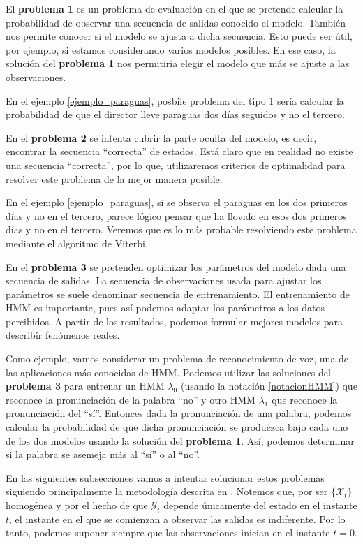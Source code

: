 El \textbf{problema 1} es un problema de evaluación en el que se pretende calcular la probabilidad de observar una secuencia de salidas conocido el modelo. También nos permite conocer si el modelo se ajusta a dicha secuencia. Esto puede ser útil, por ejemplo, si estamos considerando varios modelos posibles. En ese caso, la solución del \textbf{problema 1} nos permitiría elegir el modelo que más se ajuste a las observaciones.

En el ejemplo \ref{ejemplo_paraguas}, posbile problema del tipo 1 sería calcular la probabilidad de que el director lleve paraguas dos días seguidos y no el tercero.

En el \textbf{problema 2} se intenta cubrir la parte oculta del modelo, es decir, encontrar la secuencia \enquote{correcta} de estados. Está claro que en realidad no existe una secuencia \enquote{correcta}, por lo que, utilizaremos criterios de optimalidad para resolver este problema de la mejor manera posible. 

En el ejemplo \ref{ejemplo_paraguas}, si se observa el paraguas en los dos primeros días y no en el tercero, parece lógico pensar que ha llovido en esos dos primeros días y no en el tercero. Veremos que es lo más probable resolviendo este problema mediante el algoritmo de Viterbi.

En el \textbf{problema 3} se pretenden optimizar los parámetros del modelo dada una secuencia de salidas. La secuencia de observaciones usada para ajustar los parámetros se suele denominar secuencia de entrenamiento. El entrenamiento de HMM es importante, pues así podemos adaptar los parámetros a los datos percibidos. A partir de los resultados, podemos formular mejores modelos para describir fenómenos reales.

Como ejemplo, vamos considerar un problema de reconocimiento de voz, una de las aplicaciones más conocidas de HMM. Podemos utilizar las soluciones del \textbf{problema 3} para entrenar un HMM $\lambda_0$ (usando la notación \eqref{notacionHMM}) que reconoce la pronunciación de la palabra \enquote{no} y otro HMM $\lambda_1$ que reconoce la pronunciación del \enquote{sí}. Entonces dada la pronunciación de una palabra, podemos calcular la probabilidad de que dicha pronunciación se produczca bajo cada uno de los dos modelos usando la solución del \textbf{problema 1}. Así, podemos determinar si la palabra se asemeja más al \enquote{sí} o al \enquote{no}.  

En las siguientes subsecciones vamos a intentar solucionar estos problemas siguiendo principalmente la metodología descrita en \cite{Rabiner}. Notemos que, por ser $\{\mathcal{X}_t\}$ homogénea y por el hecho de que $\mathcal{Y}_t$ depende únicamente del estado en el instante $t$, el instante en el que se comienzan a observar las salidas es indiferente. Por lo tanto, podemos suponer siempre que las observaciones inician en el instante $t=0$.

